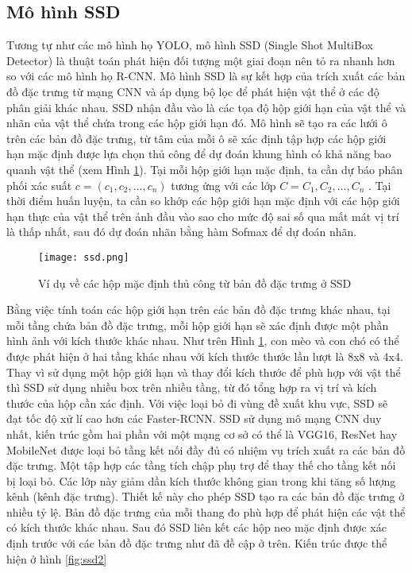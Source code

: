 \documentclass[../the.tex]{subfiles}
\begin{document}
\subsection{Mô hình SSD}
\label{sec:ssd}
{\fontsize{13}{12} \selectfont

	Tương tự như các mô hình họ YOLO, mô hình SSD \cite{Liu_2016} (Single Shot MultiBox Detector) là thuật toán phát hiện đối tượng một giai đoạn nên tỏ ra nhanh hơn so với các mô hình họ R-CNN.
	Mô hình SSD là sự kết hợp của trích xuất các bản đồ đặc trưng từ mạng CNN và áp dụng bộ lọc để phát hiện vật thể ở các độ phân giải khác nhau. SSD nhận đầu vào là các tọa độ hộp giới hạn của vật thể và nhãn của vật thể chứa trong các hộp giới hạn đó.
	Mô hình sẽ tạo ra các lưới ô trên các bản đồ đặc trưng, từ tâm của mỗi ô sẽ xác định tập hợp các hộp giới hạn mặc định được lựa chọn thủ công để dự đoán khung hình có khả năng bao quanh vật thể (xem Hình \ref{fig:ssd}).
	Tại mỗi hộp giới hạn mặc định, ta cần dự báo phân phối xác suất $c = (c_1, c_2,\dots, c_n)$ tương ứng với các lớp $C= C_1, C_2,\dots,C_n $ . Tại thời điểm huấn luyện, ta cần so khớp các hộp giới hạn mặc định với các hộp giới hạn thực của vật thể trên ảnh đầu vào sao cho mức độ sai số qua mất mát vị trí là thấp nhất, sau đó dự đoán nhãn bằng hàm Sofmax để dự đoán nhãn.

}

\begin{figure}[H]
	\centering
	\texttt{[image: ssd.png]}
	\caption{Ví dụ về các hộp mặc định thủ công từ bản đồ đặc trưng ở SSD \cite{Liu_2016}}
	\label{fig:ssd}
\end{figure}

{\fontsize{13}{12} \selectfont

Bằng việc tính toán các hộp giới hạn trên các bản đồ đặc trưng khác nhau, tại mỗi tầng chứa bản đồ đặc trưng, mỗi hộp giới hạn sẽ xác định được một phần hình ảnh với kích thước khác nhau. Như trên Hình \ref{fig:ssd}, con mèo và con chó có thể được phát hiện ở hai tầng khác nhau với kích thước thước lần lượt là 8x8 và 4x4. Thay vì sử dụng một hộp giới hạn và thay đổi kích thước để phù hợp với vật thể thì SSD sử dụng nhiều box trên nhiều tầng, từ đó tổng hợp ra vị trí và kích thước của hộp cần xác định. Với việc loại bỏ đi vùng đề xuất khu vực, SSD sẽ đạt tốc độ xử lí cao hơn các Faster-RCNN.
SSD sử dụng mô mạng CNN duy nhất, kiến trúc gồm hai phần với một mạng cơ sở có thể là VGG16, ResNet hay MobileNet được loại bỏ tầng kết nối đầy đủ có nhiệm vụ trích xuất ra các bản đồ đặc trưng.
Một tập hợp các tầng tích chập phụ trợ để thay thế cho tầng kết nối bị loại bỏ. Các lớp này giảm dần kích thước không gian trong khi tăng số lượng kênh (kênh đặc trưng). Thiết kế này cho phép SSD tạo ra các bản đồ đặc trưng ở nhiều tỷ lệ. Bản đồ đặc trưng của mỗi thang đo phù hợp để phát hiện các vật thể có kích thước khác nhau.
Sau đó SSD liên kết các hộp neo mặc định được xác định trước với các bản đồ đặc trưng như đã đề cập ở trên.
Kiến trúc được thể hiện ở hình \ref{fig:ssd2}

}
\end{document}
